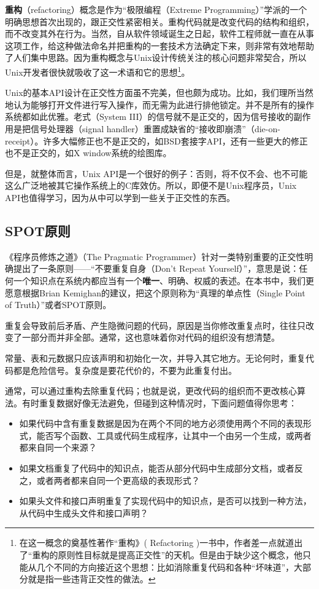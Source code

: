 \documentclass[12pt,oneside]{book}
\begin{document}
\begin{common-format}
\textbf{重构}（refactoring）概念是作为“极限编程（Extreme Programming）”学派的一个明确思想首次出现的，跟正交性紧密相关。重构代码就是改变代码的结构和组织，而不改变其外在行为。当然，自从软件领域诞生之日起，软件工程师就一直在从事这项工作，给这种做法命名并把重构的一套技术方法确定下来，则非常有效地帮助了人们集中思路。因为重构概念与Unix设计传统关注的核心问题非常契合，所以Unix开发者很快就吸收了这一术语和它的思想\footnote{在这一概念的奠基性著作“重构》( Refactoring )\cite{Fowler}一书中，作者差一点就道出了“重构的原则性目标就是提高正交性”的天机。但是由于缺少这个概念，他只能从几个不同的方向接近这个思想：比如消除重复代码和各种“坏味道”，大部分就是指一些违背正交性的做法。}。

Unix的基本API设计在正交性方面虽不完美，但也颇为成功。比如，我们理所当然地认为能够打开文件进行写入操作，而无需为此进行排他锁定。并不是所有的操作系统都如此优雅。老式（System III）的信号就不是正交的，因为信号接收的副作用是把信号处理器（signal handler）重置成缺省的“接收即崩溃”（die-on-receipt）。许多大幅修正也不是正交的，如BSD套接字API，还有一些更大的修正也不是正交的，如X window系统的绘图库。

但是，就整体而言，Unix API是一个很好的例子：否则，将不仅不会、也不可能这么广泛地被其它操作系统上的C库效仿。所以，即便不是Unix程序员，Unix API也值得学习，因为从中可以学到一些关于正交性的东西。


\subsection{SPOT原则}
《程序员修炼之道》（The Pragmatic Programmer）针对一类特别重要的正交性明确提出了一条原则——“不要重复自身（Don't Repeat Yourself）”，意思是说：任何一个知识点在系统内都应当有一个\textbf{唯一}、明确、权威的表述。在本书中，我们更愿意根据Brian Kemighan的建议，把这个原则称为“真理的单点性（Single Point of Truth）”或者SPOT原则。

重复会导致前后矛盾、产生隐微问题的代码，原因是当你修改重复点时，往往只改变了一部分而并非全部。通常，这也意味着你对代码的组织没有想清楚。

常量、表和元数据只应该声明和初始化一次，并导入其它地方。无论何时，重复代码都是危险信号。复杂度是要花代价的，不要为此重复付出。

通常，可以通过重构去除重复代码；也就是说，更改代码的组织而不更改核心算法。有时重复数据好像无法避免，但碰到这种情况时，下面问题值得你思考：

\begin{itemize}
\item 如果代码中含有重复数据是因为在两个不同的地方必须使用两个不同的表现形式，能否写个函数、工具或代码生成程序，让其中一个由另一个生成，或两者都来自同一个来源？
\item 如果文档重复了代码中的知识点，能否从部分代码中生成部分文档，或者反之，或者两者都来自同一个更高级的表现形式？
\item 如果头文件和接口声明重复了实现代码中的知识点，是否可以找到一种方法，从代码中生成头文件和接口声明？
\end{itemize}


\end{common-format}
\end{document}
